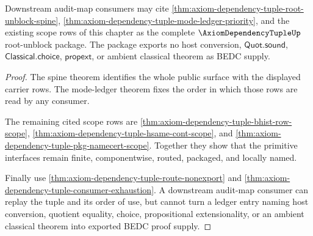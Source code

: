 \begin{theorem}
\label{thm:axiom-dependency-tuple-consumer-readiness}
Downstream audit-map consumers may cite
\autoref{thm:axiom-dependency-tuple-root-unblock-spine},
\autoref{thm:axiom-dependency-tuple-mode-ledger-priority}, and the existing
scope rows of this chapter as the complete $\AxiomDependencyTupleUp$
root-unblock package. The package exports no host conversion,
$\mathsf{Quot.sound}$, $\mathsf{Classical.choice}$, $\mathsf{propext}$, or
ambient classical theorem as BEDC supply.
\end{theorem}
\begin{proof}
The spine theorem identifies the whole public surface with the displayed
carrier rows. The mode-ledger theorem fixes the order in which those rows are
read by any consumer.

The remaining cited scope rows are
\autoref{thm:axiom-dependency-tuple-bhist-row-scope},
\autoref{thm:axiom-dependency-tuple-hsame-cont-scope}, and
\autoref{thm:axiom-dependency-tuple-pkg-namecert-scope}. Together they show that
the primitive interfaces remain finite, componentwise, routed, packaged, and
locally named.

Finally use \autoref{thm:axiom-dependency-tuple-route-nonexport} and
\autoref{thm:axiom-dependency-tuple-consumer-exhaustion}. A downstream
audit-map consumer can replay the tuple and its order of use, but cannot turn a
ledger entry naming host conversion, quotient equality, choice, propositional
extensionality, or an ambient classical theorem into exported BEDC proof
supply.
\end{proof}

